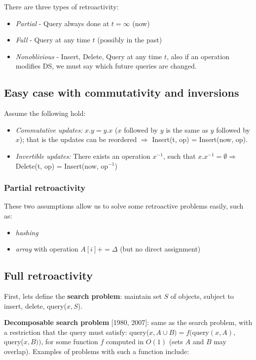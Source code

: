 \documentclass[11pt]{article}
\begin{document}
There are three types of retroactivity:
\begin{itemize}
\item {\em Partial} - Query always done at $t = \infty$ (now)
\item {\em Full} - Query at any time $t$ (possibly in the past)
\item {\em Nonoblivious} - Insert, Delete, Query at any time $t$, also if an operation modifies DS, we must say which future queries are changed.
\end{itemize}

\subsection{Easy case with commutativity and inversions}

Assume the following hold:
\begin{itemize}
\item {\em Commutative updates:} $x.y = y.x$ ($x$ followed by $y$ is the same as $y$ followed by $x$); that is the updates can be reordered $\Rightarrow$ Insert(t, op) = Insert(now, op).
\item {\em Invertible updates:} There exists an operation $x^{-1}$, such that $x.x^{-1} = \emptyset \Rightarrow$ Delete(t, op) = Insert(now, op$^{-1}$)
\end{itemize}

\subsubsection{Partial retroactivity}

These two assumptions allow us to solve some retroactive problems easily, such as:
\begin{itemize}
\item {\em hashing} 
\item {\em array} with operation $A[i] += \Delta$ (but no direct assignment)
\end{itemize}

\subsection{Full retroactivity}

First, lets define the {\bf search problem}: maintain set $S$ of objects, subject to insert, delete, query($x, S$).

{\bf Decomposable search problem} [1980, 2007]: same as the search problem, with a restriction that the query must satisfy:
query($x, A \cup B) = f($query$(x, A), $query($x, B))$, for some function $f$ computed in $O(1)$ (sets $A$ and $B$ may overlap). Examples of problems with such a function include:
\end{document}
